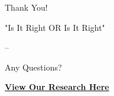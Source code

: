 \begin{frame}[plain]
    \begin{center}
        {\Huge Thank You!}
        
        \vspace{1cm}
        
        {\LARGE "Is It Right OR Is It Right"}
        
        \vspace{0.5cm}
        
        {\large -- }

        \vspace{1cm}
        
        {\Large Any Questions?}

        \vspace{1cm}

        {\large \href{http://hdl.handle.net/20.500.12281/16159}{\textbf{View Our Research Here}}}
    \end{center}
\end{frame}
